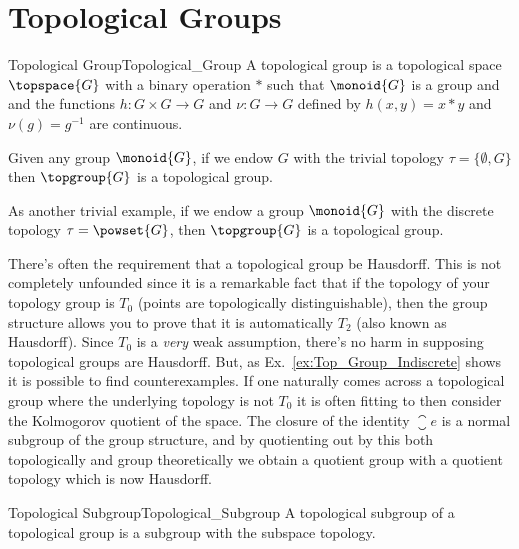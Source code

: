 \documentclass{book}                                                            %
\begin{document}
        \section{Topological Groups}
            \begin{fdefinition}{Topological Group}{Topological_Group}
                A topological group is a topological space $\topspace{G}$ with a
                binary operation $*$ such that $\monoid{G}$ is a group and and
                the functions $h:G\times{G}\rightarrow{G}$ and
                $\nu:G\rightarrow{G}$ defined by $h(x,y)=x*y$ and
                $\nu(g)=g^{\minus{1}}$ are continuous.
            \end{fdefinition}
            \begin{example}
                \label{ex:Top_Group_Indiscrete}%
                Given any group $\monoid{G}$, if we endow $G$ with the trivial
                topology $\tau=\{\emptyset,G\}$ then $\topgroup{G}$ is a
                topological group.
            \end{example}
            \begin{example}
                As another trivial example, if we endow a group $\monoid{G}$
                with the discrete topology $\tau=\powset{G}$, then
                $\topgroup{G}$ is a topological group. 
            \end{example}
            There's often the requirement that a topological group be Hausdorff.
            This is not completely unfounded since it is a remarkable fact that
            if the topology of your topology group is $T_{0}$ (points are
            topologically distinguishable), then the group structure allows you
            to prove that it is automatically $T_{2}$ (also known as Hausdorff).
            Since $T_{0}$ is a \textit{very} weak assumption, there's no harm in
            supposing topological groups are Hausdorff. But, as
            Ex.~\ref{ex:Top_Group_Indiscrete} shows it is possible to find
            counterexamples. If one naturally comes across a topological group
            where the underlying topology is not $T_{0}$ it is often fitting to
            then consider the Kolmogorov quotient of the space. The closure of
            the identity $\closure{e}$ is a normal subgroup of the group
            structure, and by quotienting out by this both topologically and
            group theoretically we obtain a quotient group with a quotient
            topology which is now Hausdorff.
            \begin{fdefinition}{Topological Subgroup}{Topological_Subgroup}
                A topological subgroup of a topological group is a subgroup with
                the subspace topology.
            \end{fdefinition}
\end{document}
